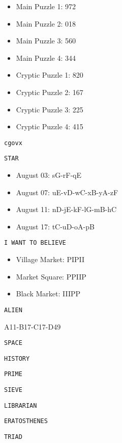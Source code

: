 
\begin{itemize}
\item Main Puzzle 1: 972
\item Main Puzzle 2: 018
\item Main Puzzle 3: 560
\item Main Puzzle 4: 344
\item Cryptic Puzzle 1: 820
\item Cryptic Puzzle 2: 167
\item Cryptic Puzzle 3: 225
\item Cryptic Puzzle 4: 415
\end{itemize}


\texttt{cgovx}


\texttt{STAR}


\begin{itemize}
\item August 03: sG-rF-qE 
\item August 07: uE-vD-wC-xB-yA-zF
\item August 11: nD-jE-kF-lG-mB-hC
\item August 17: tC-uD-oA-pB
\end{itemize}


\texttt{I WANT TO BELIEVE}


\begin{itemize}
\item Village Market: PIPII
\item Market Square: PPIIP 
\item Black Market: IIIPP
\end{itemize}


\texttt{ALIEN}


A11-B17-C17-D49


\texttt{SPACE}


\texttt{HISTORY}


\texttt{PRIME}


\texttt{SIEVE}


\texttt{LIBRARIAN}


\texttt{ERATOSTHENES}


\texttt{TRIAD}
